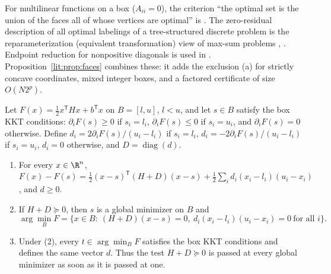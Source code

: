 \begin{remark}[Attribution]
For multilinear functions on a box ($A_{ii}=0$), the criterion ``the optimal set is the union of
the faces all of whose vertices are optimal'' is \cite[Lemma and Proposition~1, p.~96]{Rosenberg1972}.
The zero-residual description of all optimal labelings of a tree-structured discrete problem is
the reparameterization (equivalent transformation) view of max-sum problems
\cite[Section~III-D, Theorem~4]{Werner2007}, \cite[Proposition~1]{WainwrightJaakkolaWillsky2005}.
Endpoint reduction for nonpositive diagonals is used in
\cite{DelPiaKhajavirad2026,Khajavirad2026PolyBox}. Proposition~\ref{lit:prop:faces} combines these:
it adds the exclusion (a) for strictly concave coordinates, mixed integer boxes, and a factored
certificate of size $O(N2^p)$.
\end{remark}

\begin{proposition}\label{lit:prop:diag}
Let $F(x)=\tfrac12x^{\mathsf T}Hx+b^{\mathsf T}x$ on $B=[l,u]$, $l<u$, and let $s\in B$ satisfy
the box KKT conditions: $\partial_iF(s)\ge0$ if $s_i=l_i$, $\partial_iF(s)\le0$ if $s_i=u_i$, and
$\partial_iF(s)=0$ otherwise. Define $d_i=2\partial_iF(s)/(u_i-l_i)$ if $s_i=l_i$,
$d_i=-2\partial_iF(s)/(u_i-l_i)$ if $s_i=u_i$, $d_i=0$ otherwise, and $D=\operatorname{diag}(d)$.
\begin{enumerate}
\item For every $x\in\R^n$,
$F(x)-F(s)=\tfrac12(x-s)^{\mathsf T}(H+D)(x-s)+\tfrac12\sum_id_i(x_i-l_i)(u_i-x_i)$, and $d\ge0$.
\item If $H+D\succeq0$, then $s$ is a global minimizer on $B$ and
\[
\arg\min_BF=\{x\in B:\ (H+D)(x-s)=0,\ d_i(x_i-l_i)(u_i-x_i)=0\ \text{for all }i\}.
\]
\item Under (2), every $t\in\arg\min_BF$ satisfies the box KKT conditions and defines the same
vector $d$. Thus the test $H+D\succeq0$ is passed at every global minimizer as soon as it is
passed at one.
\end{enumerate}
\end{proposition}

